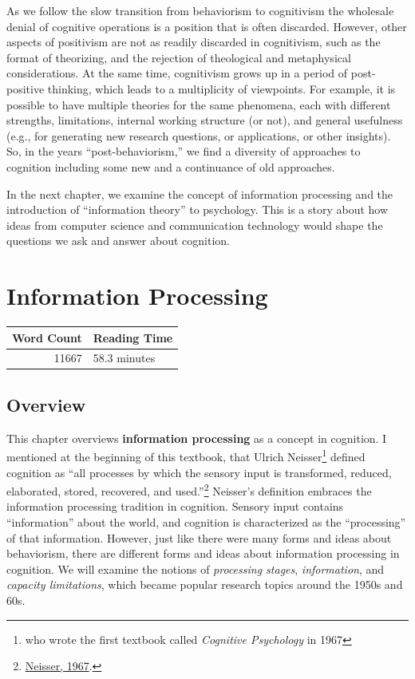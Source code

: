 \documentclass[
  oneside,
  12pt]{crumpbook}
\begin{document}
As we follow the slow transition from behaviorism to cognitivism the wholesale denial of cognitive operations is a position that is often discarded. However, other aspects of positivism are not as readily discarded in cognitivism, such as the format of theorizing, and the rejection of theological and metaphysical considerations. At the same time, cognitivism grows up in a period of post-positive thinking, which leads to a multiplicity of viewpoints. For example, it is possible to have multiple theories for the same phenomena, each with different strengths, limitations, internal working structure (or not), and general usefulness (e.g., for generating new research questions, or applications, or other insights). So, in the years ``post-behaviorism,'' we find a diversity of approaches to cognition including some new and a continuance of old approaches.

In the next chapter, we examine the concept of information processing and the introduction of ``information theory'' to psychology. This is a story about how ideas from computer science and communication technology would shape the questions we ask and answer about cognition.

\hypertarget{information-processing}{%
\chapter{Information Processing}\label{information-processing}}

\begin{tabular}{r|l}
\hline
Word Count & Reading Time\\
\hline
11667 & 58.3 minutes\\
\hline
\end{tabular}

\hypertarget{overview-1}{%
\section{Overview}\label{overview-1}}

This chapter overviews \textbf{information processing} as a concept in cognition. I mentioned at the beginning of this textbook, that Ulrich Neisser\footnote{who wrote the first textbook called \emph{Cognitive Psychology} in 1967} defined cognition as ``all processes by which the sensory input is transformed, reduced, elaborated, stored, recovered, and used.''\footnote{\protect\hyperlink{ref-neisserCognitivePsychology1967}{Neisser, 1967}.} Neisser's definition embraces the information processing tradition in cognition. Sensory input contains ``information'' about the world, and cognition is characterized as the ``processing'' of that information. However, just like there were many forms and ideas about behaviorism, there are different forms and ideas about information processing in cognition. We will examine the notions of \emph{processing stages}, \emph{information}, and \emph{capacity limitations}, which became popular research topics around the 1950s and 60s.
\end{document}
